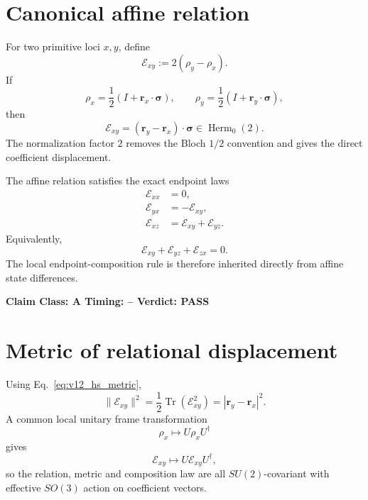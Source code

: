 \documentclass[11pt,a4paper,twoside]{book}
\theoremstyle{definition}
\newcommand{\vTwelveStatus}[3]{\par\noindent\textbf{Claim Class: #1 \quad Timing: #2 \quad Verdict: #3}\par}
\begin{document}
\section{Canonical affine relation}

For two primitive loci $x,y$, define
\begin{equation}
\boxed{
\mathcal E_{xy}:=2(\rho_y-\rho_x).
}
\label{eq:v12_affine_relation}
\end{equation}
If
\[
\rho_x=\frac12(I+\mathbf r_x\cdot\boldsymbol\sigma),
\qquad
\rho_y=\frac12(I+\mathbf r_y\cdot\boldsymbol\sigma),
\]
then
\begin{equation}
\boxed{
\mathcal E_{xy}
=(\mathbf r_y-\mathbf r_x)\cdot\boldsymbol\sigma
\in\operatorname{Herm}_0(2).
}
\end{equation}
The normalization factor $2$ removes the Bloch $1/2$ convention and gives the direct coefficient displacement.

The affine relation satisfies the exact endpoint laws
\begin{align}
\mathcal E_{xx}&=0,\\
\mathcal E_{yx}&=-\mathcal E_{xy},\\
\boxed{\mathcal E_{xz}}&=\boxed{\mathcal E_{xy}+\mathcal E_{yz}}.
\label{eq:v12_endpoint_composition}
\end{align}
Equivalently,
\begin{equation}
\mathcal E_{xy}+\mathcal E_{yz}+\mathcal E_{zx}=0.
\end{equation}
The local endpoint-composition rule is therefore inherited directly from affine state differences.
\vTwelveStatus{A}{--}{PASS}

\section{Metric of relational displacement}

Using Eq.~\eqref{eq:v12_hs_metric},
\begin{equation}
\boxed{
\|\mathcal E_{xy}\|^2
=\frac12\operatorname{Tr}(\mathcal E_{xy}^2)
=|\mathbf r_y-\mathbf r_x|^2.
}
\label{eq:v12_affine_relation_metric}
\end{equation}
A common local unitary frame transformation
\begin{equation}
\rho_x\mapsto U\rho_xU^\dagger
\end{equation}
gives
\begin{equation}
\mathcal E_{xy}\mapsto U\mathcal E_{xy}U^\dagger,
\end{equation}
so the relation, metric and composition law are all $SU(2)$-covariant with effective $SO(3)$ action on coefficient vectors.
\end{document}
